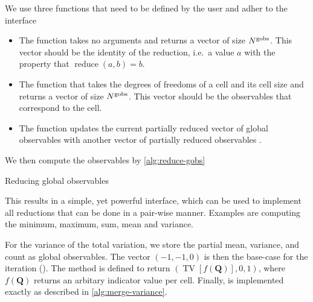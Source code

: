 We use three functions that need to be defined by the user and adher to the interface
\begin{itemize}
\item The function  takes no arguments and returns a vector of size $N^{\text{gobs}}$.
  This vector should be the identity of the reduction, i.e.\ a value $a$ with the property that $\operatorname{reduce}(a, b) = b$.
\item The function  that takes the degrees of freedoms of a cell and its cell size and returns a vector of size $N^{\text{gobs}}$.
  This vector should be the observables that correspond to the cell.
\item The function  updates the current partially reduced vector of global observables  with another vector of partially reduced observables .
\end{itemize}
We then compute the observables by \cref{alg:reduce-gobs}
\begin{algorithm}[htb]
  \begin{algorithmic}
    \EndFor{}
    \State{}
  \end{algorithmic}
  \caption{\label{alg:reduce-gobs}Reducing global observables}
\end{algorithm}
This results in a simple, yet powerful interface, which can be used to implement all reductions that can be done in a pair-wise manner.
Examples are computing the minimum, maximum, sum, mean and variance.

For the variance of the total variation, we store the partial mean, variance, and count as global observables.
The vector $(-1, -1, 0)$ is then the base-case for the iteration ().
The method  is defined to return $\left( \operatorname{TV} \left[ f(\bm{Q}) \right], 0, 1 \right)$, where $f(\bm{Q})$ returns an arbitary indicator value per cell.
Finally,  is implemented exactly as described in \cref{alg:merge-variance}.

